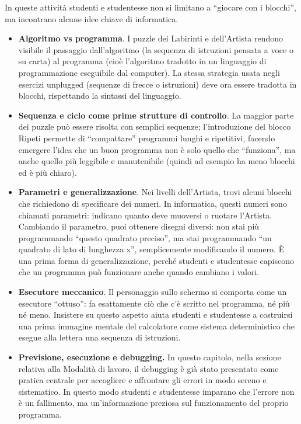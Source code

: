 In queste attività studenti e studentesse non si limitano a ``giocare con i blocchi'', ma incontrano alcune idee chiave di informatica.

\begin{itemize}
\item
  \textbf{Algoritmo vs programma}. I puzzle dei Labirinti e dell'Artista rendono visibile il passaggio dall'algoritmo (la sequenza di istruzioni pensata a voce o su carta) al programma (cioè l'algoritmo tradotto in un linguaggio di programmazione eseguibile dal computer). La stessa strategia usata negli esercizi unplugged (sequenze di frecce o istruzioni) deve ora essere tradotta in blocchi, rispettando la sintassi del linguaggio.
\item
  \textbf{Sequenza e ciclo come prime strutture di controllo}. La maggior parte dei puzzle può essere risolta con semplici sequenze; l'introduzione del blocco Ripeti permette di ``compattare'' programmi lunghi e ripetitivi, facendo emergere l'idea che un buon programma non è solo quello che ``funziona'', ma anche quello più leggibile e manutenibile (quindi ad esempio ha meno blocchi ed è più chiaro).
\item
  \textbf{Parametri e generalizzazione}. Nei livelli dell'Artista, trovi alcuni blocchi che richiedono di specificare dei numeri. In informatica, questi numeri sono chiamati parametri: indicano quanto deve muoversi o ruotare l'Artista. Cambiando il parametro, puoi ottenere disegni diversi: non stai più programmando ``questo quadrato preciso'', ma stai programmando ``un quadrato di lato di lunghezza x'', semplicemente modificando il numero. È una prima forma di generalizzazione, perché studenti e studentesse capiscono che un programma può funzionare anche quando cambiano i valori.
\item
  \textbf{Esecutore meccanico}. Il personaggio sullo schermo si comporta come un esecutore ``ottuso'': fa esattamente ciò che c'è scritto nel programma, né più né meno. Insistere su questo aspetto aiuta studenti e studentesse a costruirsi una prima immagine mentale del calcolatore come sistema deterministico che esegue alla lettera una sequenza di istruzioni.
\item
  \textbf{Previsione, esecuzione e debugging.} In questo capitolo, nella sezione relativa alla Modalità di lavoro, il debugging è già stato presentato come pratica centrale per accogliere e affrontare gli errori in modo sereno e sistematico. In questo modo studenti e studentesse imparano che l'errore non è un fallimento, ma un'informazione preziosa sul funzionamento del proprio programma.
\end{itemize}

